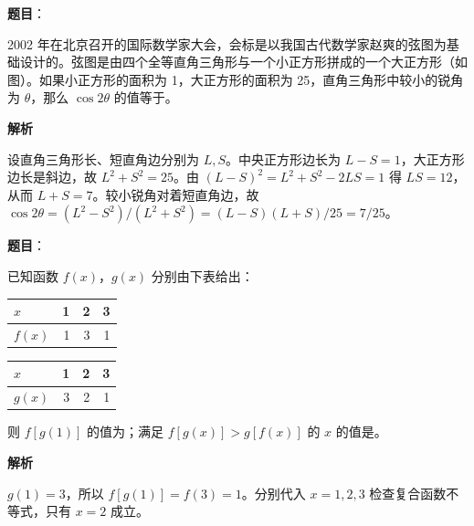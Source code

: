 \begin{answer}

\textbf{题目}：

2002 年在北京召开的国际数学家大会，会标是以我国古代数学家赵爽的弦图为基础设计的。弦图是由四个全等直角三角形与一个小正方形拼成的一个大正方形（如图）。如果小正方形的面积为 1，大正方形的面积为 25，直角三角形中较小的锐角为 $\theta$，那么 $\cos 2\theta$ 的值等于\gkblank{}。
\nopagebreak[4]
\begin{center}\end{center}
\nopagebreak[4]
\textbf{解析}

设直角三角形长、短直角边分别为 $L,S$。中央正方形边长为 $L-S=1$，大正方形边长是斜边，故 $L^2+S^2=25$。由 $(L-S)^2=L^2+S^2-2LS=1$ 得 $LS=12$，从而 $L+S=7$。较小锐角对着短直角边，故
$\cos2\theta=(L^2-S^2)/(L^2+S^2)=(L-S)(L+S)/25=7/25$。


\end{answer}
\begin{answer}

\textbf{题目}：

已知函数 $f(x)$，$g(x)$ 分别由下表给出：

\begin{center}
\begin{tabular}{lrrr}
\toprule
$x$ & 1 & 2 & 3 \\
\midrule
$f(x)$ & 1 & 3 & 1 \\
\bottomrule
\end{tabular}
\end{center}

\begin{center}
\begin{tabular}{lrrr}
\toprule
$x$ & 1 & 2 & 3 \\
\midrule
$g(x)$ & 3 & 2 & 1 \\
\bottomrule
\end{tabular}
\end{center}

则 $f[g(1)]$ 的值为\gkblank{}；满足 $f[g(x)]>g[f(x)]$ 的 $x$ 的值是\gkblank{}。

\textbf{解析}

$g(1)=3$，所以 $f[g(1)]=f(3)=1$。分别代入 $x=1,2,3$ 检查复合函数不等式，只有 $x=2$ 成立。


\end{answer}

